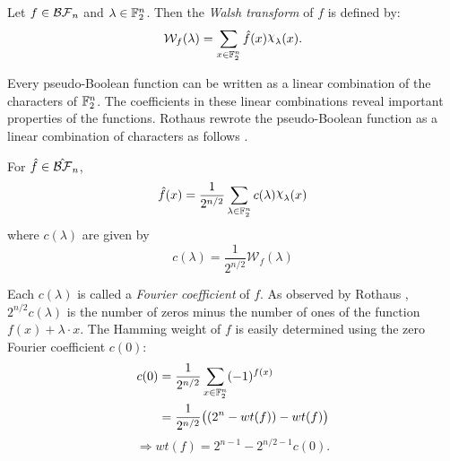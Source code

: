
\begin{definition}\label{def:walsh}
  Let $f\in\mathcal{BF}_n$ and $\lambda\in\mathbb{F}_2^n$. Then the {\em Walsh transform}
  of $f$ is defined by:
  \begin{equation}\label{eqn:walsh}
    \mathcal{W}_f(\lambda)=\sum_{x\in\gftwo^n}\hat{f}(x)\Chi_\lambda(x).
  \end{equation}
\end{definition}

\par Every pseudo-Boolean function can be written as a linear combination of
the characters of $\mathbb{F}_2^n$. The coefficients in these linear combinations
reveal important properties of the functions. Rothaus rewrote the
pseudo-Boolean function as a linear combination of characters
as follows \cite{art:r76}. 

\begin{lemma}
  For $\hat{f}\in\hat{\mathcal{BF}}_n$,
\begin{equation}\label{eqn:rewrite-pseudo}
	\hat{f}(x)
    =\frac{1}{2^{n/2}}
      \sum_{\lambda\in\gftwo^n}c(\lambda)\Chi_\lambda(x)
\end{equation}
	where $c(\lambda)$ are given by
  \begin{equation}\label{eqn:clambda}
    c(\lambda)=\frac{1}{2^{n/2}}\mathcal{W}_f(\lambda)
  \end{equation}
\end{lemma}

\par Each $c(\lambda)$ is called a \textit{Fourier coefficient} of $f$.
As observed by Rothaus \cite{art:r76}, $2^{n/2}c(\lambda)$ is the
number of zeros minus the number of ones of the function
$f(x)+\lambda\cdot x$. The Hamming weight of $f$ is easily determined using
the zero Fourier coefficient $c(0)$:
\begin{align*}
	c(0)&=\frac{1}{2^{n/2}}\sum_{x\in\mathbb{F}_2^n}(-1)^{f(x)}\\
	&=\frac{1}{2^{n/2}}\big((2^n-wt(f))-wt(f)\big)
\end{align*}
\begin{equation}
  \Rightarrow wt(f)=2^{n-1}-2^{n/2-1}c(0).
\end{equation}

